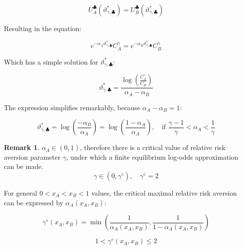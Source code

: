 \documentclass{article}
\theoremstyle{definition}
\newtheorem*{remark}{Remark}
\begin{document}
\begin{equation}
    U_A^\clubsuit(\vartheta^*_{\gamma,\clubsuit}) =
    U_B^\clubsuit(\vartheta^*_{\gamma,\clubsuit})
\end{equation}

Resulting in the equation:

\begin{equation}
    e^{-\alpha_A \vartheta^*_{\gamma,\clubsuit}} C^\gamma_A = 
    e^{-\alpha_B \vartheta^*_{\gamma,\clubsuit}} C^\gamma_B
\end{equation}

Which has a simple solution for $\vartheta^*_{\gamma,\clubsuit}$:

\begin{equation}
\label{eq:vartheta_gamma_approx}
    \vartheta^*_{\gamma,\clubsuit} = \frac{\log \left (  \frac{C^\gamma_A}{C^\gamma_B}  \right ) }{\alpha_A - \alpha_B}
\end{equation}

The expression simplifies remarkably, because $\alpha_A - \alpha_B = 1$:

\begin{equation}
    \vartheta^*_{\gamma,\clubsuit} = 
    \log \left (  \frac{-\alpha_B}{\alpha_A}  \right ) =
    \log \left (  \frac{1-\alpha_A}{\alpha_A}  \right ), \quad
    \text{if } \frac{\gamma-1}{\gamma} < \alpha_A < \frac{1}{\gamma}
\end{equation}

\begin{remark}
    $\alpha_A \in (0,1)$, therefore there is a critical value of relative risk aversion parameter $\gamma$, under which a finite equilibrium log-odds approximation can be made.
    \begin{equation}
        \gamma \in (0,\gamma^{\overline{\diamond}}), \quad \gamma^{\overline{\diamond}} = 2
    \end{equation}

    For general $0<x_A<x_B<1$ values, the critical maximal relative risk aversion can be expressed by $\alpha_A(x_A,x_B)$:

    \begin{equation}
        \gamma^\diamond(x_A,x_B) = 
        \min \left (
        \frac{1}{\alpha_A(x_A,x_B)},
        \frac{1}{1-\alpha_A(x_A,x_B)}
        \right )
    \end{equation}

    \begin{equation}
        1 < \gamma^\diamond(x_A,x_B) \le 2
    \end{equation}
    
\end{remark}
\end{document}
